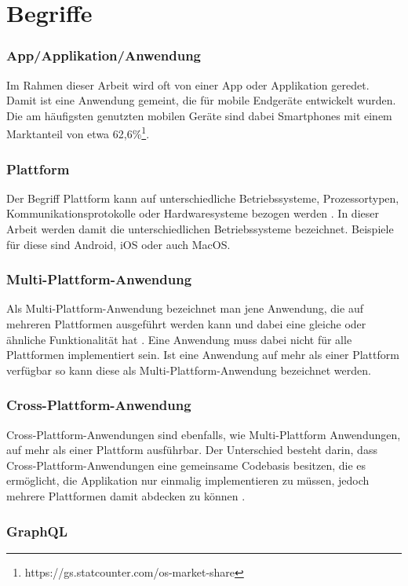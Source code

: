 \section{Begriffe}
\subsubsection{App/Applikation/Anwendung}
Im Rahmen dieser Arbeit wird oft von einer App oder Applikation geredet. Damit ist eine Anwendung gemeint, die für mobile Endgeräte entwickelt wurden. Die am häufigsten genutzten mobilen Geräte sind dabei Smartphones mit einem Marktanteil von etwa 62,6\%\footnote{https://gs.statcounter.com/os-market-share}.

\subsubsection{Plattform}
Der Begriff Plattform kann auf unterschiedliche Betriebssysteme, Prozessortypen, Kommunikationsprotokolle oder Hardwaresysteme bezogen werden \cite{2014Mulit_plattform_definition}. In dieser Arbeit werden damit die unterschiedlichen Betriebssysteme bezeichnet. Beispiele für diese sind Android, iOS oder auch MacOS.

\subsubsection{Multi-Plattform-Anwendung}
Als Multi-Plattform-Anwendung bezeichnet man jene Anwendung, die auf mehreren Plattformen ausgeführt werden kann und dabei eine gleiche oder ähnliche Funktionalität hat \cite{2014Mulit_plattform_definition}. Eine Anwendung muss dabei nicht für alle Plattformen implementiert sein. Ist eine Anwendung auf mehr als einer Plattform verfügbar so kann diese als Multi-Plattform-Anwendung bezeichnet werden.

\subsubsection{Cross-Plattform-Anwendung}
Cross-Plattform-Anwendungen sind ebenfalls, wie Multi-Plattform Anwendungen, auf mehr als einer Plattform ausführbar. Der Unterschied besteht darin, dass Cross-Plattform-Anwendungen eine gemeinsame Codebasis besitzen, die es ermöglicht, die Applikation nur einmalig implementieren zu müssen, jedoch mehrere Plattformen damit abdecken zu können \cite{2014_Cross_plattform}.

\subsubsection{GraphQL}
